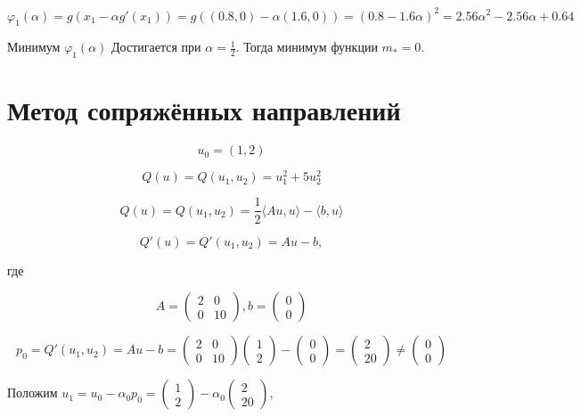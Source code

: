 \documentclass[12 pt]{article}
\begin{document}
$$\varphi_1(\alpha) = g(x_1-\alpha g'(x_1)) = g((0.8,0) - \alpha (1.6,0)) = (0.8-1.6\alpha)^2 = 2.56\alpha^2-2.56\alpha+0.64$$

Минимум $\varphi_1(\alpha)$ Достигается при $\alpha = \frac{1}{2}$. Тогда минимум функции $m_* = 0$.

\newpage

\section{Метод сопряжённых направлений}

$$u_0=(1,2)$$

$$Q(u) = Q(u_1,u_2) = u_1^2+5u_2^2$$

$$Q(u) = Q(u_1,u_2) = \frac{1}{2} \langle A u, u\rangle-\langle b, u\rangle$$

$$Q'(u)  = Q'(u_1,u_2) = Au-b,$$

где 

\begin{equation*}
	A=\left(\begin{array}{ll}
	2 & 0 \\
	0 & 10
	\end{array}\right), b=\left(\begin{array}{l}
	0 \\
	0
	\end{array}\right)
\end{equation*}


$$p_0 = Q'(u_1,u_2) = Au-b = \left(\begin{array}{ll}
2 & 0 \\
0 & 10
\end{array}\right) \left(\begin{array}{l}
1 \\
2
\end{array}\right) - \left(\begin{array}{l}
0 \\
0
\end{array}\right) = \left(\begin{array}{l}
2 \\
20
\end{array}\right) \neq \left(\begin{array}{l}
0 \\
0
\end{array}\right)$$


Положим $u_1=u_0-\alpha_0p_0 = \left(\begin{array}{l}
1 \\
2
\end{array}\right) - \alpha_0 \left(\begin{array}{l}
2 \\
20
\end{array}\right)$,
\end{document}
